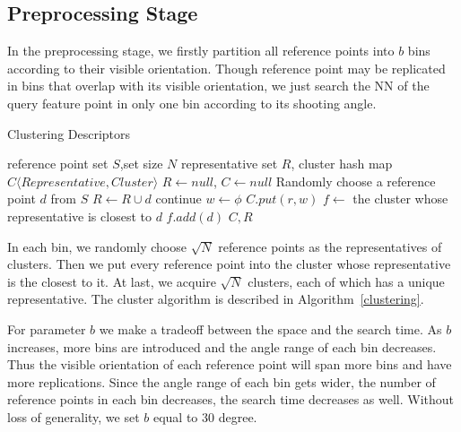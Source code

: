 \subsection{Preprocessing Stage}
In the preprocessing stage, we firstly partition all reference points into $b$ bins according to their visible orientation. Though reference point may be replicated in bins that overlap with its visible orientation, we just search the NN of the query feature point in only one bin according to its shooting angle.
\begin{algorithm}[!ht]
\caption{Clustering Descriptors}\label{clustering}
\begin{algorithmic}[1]
\Require reference point set $S$,set size $N$
\Ensure representative set $R$, cluster hash map $C\langle Representative,Cluster\rangle$
    \State $R \gets null$, $C \gets null$
        \State Randomly choose a reference point $d$ from $S$
            \State $R \gets R \cup d$
        \Else
            \State continue
        \EndIf
    \EndWhile
        \State $w \gets \phi$
        \State $C.put(r,w)$
    \EndFor
        \State $f \gets $ the cluster whose representative is closest to $d$
        \State $f.add(d)$
    \EndFor
    \State \Return $C, R$
\end{algorithmic}
\end{algorithm}
In each bin, we randomly choose $\sqrt{N}$ reference points as the representatives of clusters. Then we put every reference point into the cluster whose representative is the closest to it. At last, we acquire $\sqrt{N}$ clusters, each of which has a unique representative. The cluster algorithm is described in Algorithm~\ref{clustering}.

For parameter $b$ we make a tradeoff between the space and the search time.
As $b$ increases, more bins are introduced and the angle range of each bin decreases. Thus the visible orientation of each reference point will span more bins and have more replications. Since the angle range of each bin gets wider, the number of reference points in each bin decreases, the search time decreases as well. Without loss of generality, we set $b$ equal to 30 degree.

